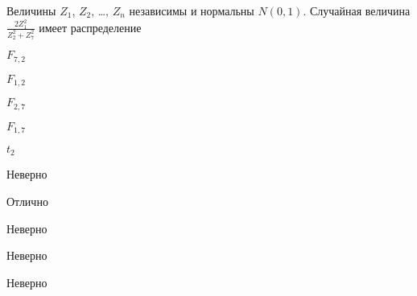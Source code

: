 
\begin{question}
Величины \(Z_1\), \(Z_2\), \ldots, \(Z_n\) независимы и нормальны
\(N(0,1)\). Случайная величина \(\frac{2Z_1^2}{Z_2^2+Z_7^2}\) имеет
распределение
\begin{answerlist}
  \item \(F_{7,2}\)
  \item \(F_{1,2}\)
  \item \(F_{2,7}\)
  \item \(F_{1,7}\)
  \item \(t_2\)
\end{answerlist}
\end{question}

\begin{solution}
\begin{answerlist}
  \item Неверно
  \item Отлично
  \item Неверно
  \item Неверно
  \item Неверно
\end{answerlist}
\end{solution}

